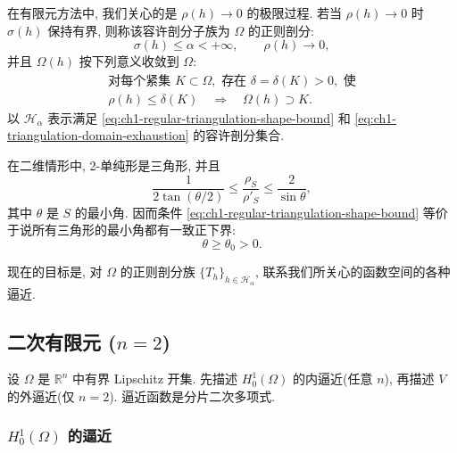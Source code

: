 在有限元方法中, 我们关心的是 $\rho(h)\to0$ 的极限过程. 若当 $\rho(h)\to0$ 时 $\sigma(h)$ 保持有界, 则称该容许剖分子族为 $\Omega$ 的正则剖分:
\begin{equation}
\sigma(h)\leq\alpha<+\infty,\qquad\rho(h)\to0,
\label{eq:ch1-regular-triangulation-shape-bound}
\end{equation}
并且 $\Omega(h)$ 按下列意义收敛到 $\Omega$:
\begin{equation}
\begin{gathered}
\text{对每个紧集 }K\subset\Omega,\text{ 存在 }\delta=\delta(K)>0,\text{ 使}\\
\rho(h)\leq\delta(K)\quad\Longrightarrow\quad\Omega(h)\supset K.
\end{gathered}
\label{eq:ch1-triangulation-domain-exhaustion}
\end{equation}
以 $\mathcal H_\alpha$ 表示满足 \eqref{eq:ch1-regular-triangulation-shape-bound} 和 \eqref{eq:ch1-triangulation-domain-exhaustion} 的容许剖分集合.

\begin{Remark}
\label{rem:ch1-triangle-minimum-angle}
在二维情形中, 2-单纯形是三角形, 并且
\[
\frac1{2\tan(\theta/2)}
\leq\frac{\rho_S}{\rho'_S}
\leq\frac2{\sin\theta},
\]
其中 $\theta$ 是 $S$ 的最小角. 因而条件 \eqref{eq:ch1-regular-triangulation-shape-bound} 等价于说所有三角形的最小角都有一致正下界:
\begin{equation}
\theta\geq\theta_0>0.
\label{eq:ch1-triangle-minimum-angle-bound}
\end{equation}
\end{Remark}

现在的目标是, 对 $\Omega$ 的正则剖分族 $\{T_h\}_{h\in\mathcal H_\alpha}$, 联系我们所关心的函数空间的各种逼近.

\subsection{\texorpdfstring{二次有限元 ($n=2$)}{二次有限元 (n=2)}}
\label{subsec:ch1-degree-two-elements}

设 $\Omega$ 是 $\mathbb R^n$ 中有界 Lipschitz 开集. 先描述 $H_0^1(\Omega)$ 的内逼近(任意 $n$), 再描述 $V$ 的外逼近(仅 $n=2$). 逼近函数是分片二次多项式.

\subsubsection{\texorpdfstring{$H_0^1(\Omega)$}{H01(Omega)} 的逼近}
\label{subsubsec:ch1-degree-two-h01}

